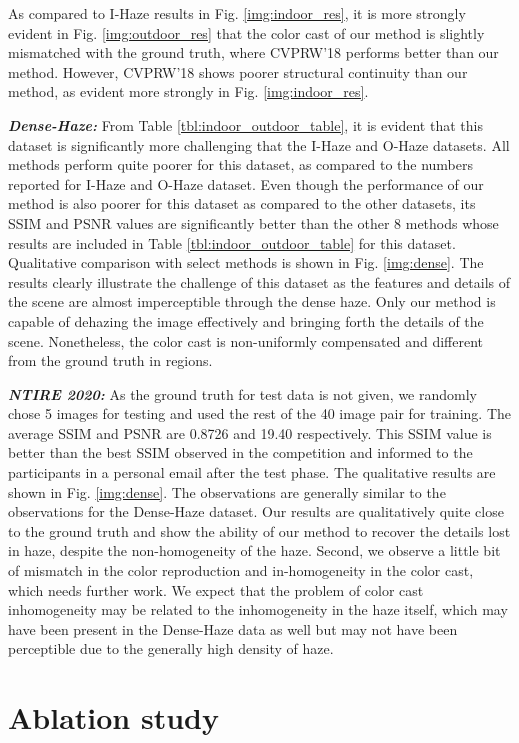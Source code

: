 \documentclass[runningheads]{llncs}
\begin{document}
As compared to I-Haze results in Fig. \ref{img:indoor_res}, it is more strongly evident in Fig. \ref{img:outdoor_res} that the color cast of our method is slightly mismatched with the ground truth, where CVPRW'18 performs better than our method. However, CVPRW'18 shows poorer structural continuity than our method, as evident more strongly in Fig. \ref{img:indoor_res}.  

\textbf{\textit{Dense-Haze:}} From Table \ref{tbl:indoor_outdoor_table}, it is evident that this dataset is significantly more challenging that the I-Haze and O-Haze datasets. All methods perform quite poorer for this dataset, as compared to the numbers reported for I-Haze and O-Haze dataset. Even though the performance of our method is also poorer for this dataset as compared to the other datasets, its SSIM and PSNR values are significantly better than the other 8 methods whose results are included in Table \ref{tbl:indoor_outdoor_table} for this dataset. Qualitative comparison with select methods is shown in Fig. \ref{img:dense}. The results clearly illustrate the challenge of this dataset as the features and details of the scene are almost imperceptible through the dense haze. Only our method is capable of dehazing the image effectively and bringing forth the details of the scene. Nonetheless, the color cast is non-uniformly compensated and different from the ground truth in regions.  

\textbf{\textit{NTIRE 2020:}} As the ground truth for test data is not given, we randomly chose 5 images for testing and used the rest of the 40 image pair for training. The average SSIM and PSNR are 0.8726 and 19.40  respectively. This SSIM value is better than the best SSIM observed in the competition and informed to the participants in a personal email after the test phase. The qualitative results are shown in Fig. \ref{img:dense}. The observations are generally similar to the observations for the Dense-Haze dataset. Our results are qualitatively quite close to the ground truth and show the ability of our method to recover the details lost in haze, despite the non-homogeneity of the haze. Second, we observe a little bit of mismatch in the color reproduction and in-homogeneity in the color cast, which needs further work. We expect that the problem of color cast inhomogeneity may be related to the inhomogeneity in the haze itself, which may have been present in the Dense-Haze data as well but may not have been perceptible due to the generally high density of haze. 

\section{Ablation study}\label{sec:ablation}
\end{document}
